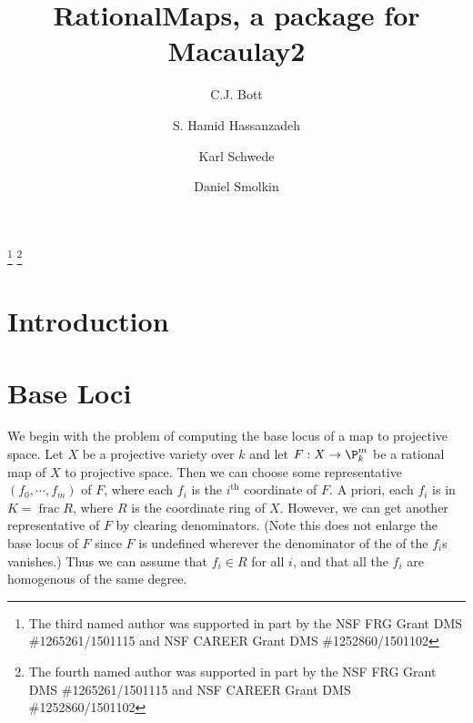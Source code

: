 \documentclass[12pt]{amsart}
\numberwithin{equation}{theorem}
\renewcommand{\:}{\colon}
\DeclareMathOperator{\ffield}{frac} %
\theoremstyle{theorem}
\begin{document}
\title{RationalMaps, a package for Macaulay2}
\author{C.J. Bott}
\author{S. Hamid Hassanzadeh}
\author{Karl Schwede}
\author{Daniel Smolkin}
\address{Department of Mathematics\\ University of Utah\\ Salt Lake City\\ UT 84112}
\address{Department of Mathematics\\ University of Utah\\ Salt Lake City\\ UT 84112}


\thanks{The third named author was supported in part by the NSF FRG Grant DMS \#1265261/1501115 and NSF CAREER Grant DMS \#1252860/1501102}
\thanks{The fourth named author was supported in part by the NSF FRG Grant DMS \#1265261/1501115 and NSF CAREER Grant DMS \#1252860/1501102}



\maketitle

\begin{abstract}

\end{abstract}



\section{Introduction}

\cite{DoriaHassanzadehSimisBirationality}

\section{Base Loci}
We begin with the problem of computing the base locus of a map to projective space. Let $X$ be a projective variety over $k$ and let $F: X \to \P_k^m$ be a rational map of $X$ to projective space. Then we can choose some representative $(f_0, \cdots, f_m)$ of $F$, where each $f_i$ is the $i^{\textrm{th}}$ coordinate of $F$. A priori, each $f_i$ is in $K = \ffield R$, where $R$ is the coordinate ring of $X$. However, we can get another representative of $F$ by clearing denominators. (Note this does not enlarge the base locus of $F$ since $F$ is undefined wherever the denominator of the of the $f_i$s vanishes.) Thus we can assume that $f_i\in R$ for all $i$, and that all the $f_i$ are homogenous of the same degree.   
\end{document}
